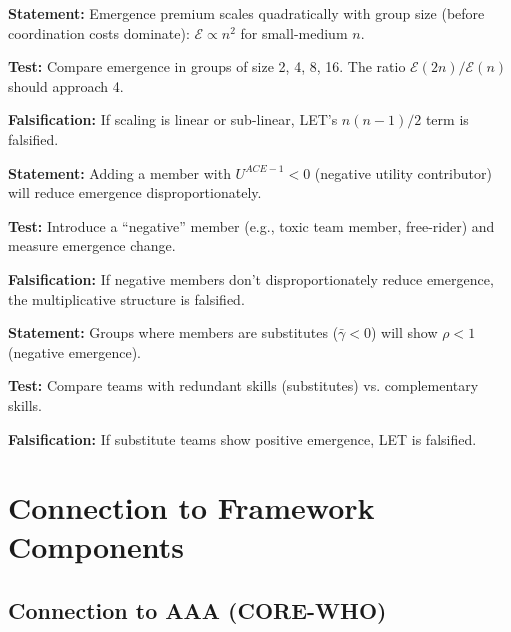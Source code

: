 \begin{tcolorbox}[colback=green!5!white, colframe=green!75!black,
    title=Prediction LET-P2: Quadratic Scaling]
\textbf{Statement:} Emergence premium scales quadratically with group size
(before coordination costs dominate):
$\mathcal{E} \propto n^2$ for small-medium $n$.

\textbf{Test:} Compare emergence in groups of size 2, 4, 8, 16. The
ratio $\mathcal{E}(2n)/\mathcal{E}(n)$ should approach 4.

\textbf{Falsification:} If scaling is linear or sub-linear, LET's
$n(n-1)/2$ term is falsified.
\end{tcolorbox}

\begin{tcolorbox}[colback=green!5!white, colframe=green!75!black,
    title=Prediction LET-P3: Negative Member Effect]
\textbf{Statement:} Adding a member with $U^{ACE-1} < 0$ (negative utility
contributor) will reduce emergence disproportionately.

\textbf{Test:} Introduce a ``negative'' member (e.g., toxic team member,
free-rider) and measure emergence change.

\textbf{Falsification:} If negative members don't disproportionately
reduce emergence, the multiplicative structure is falsified.
\end{tcolorbox}

\begin{tcolorbox}[colback=green!5!white, colframe=green!75!black,
    title=Prediction LET-P4: Substitutes Destroy Emergence]
\textbf{Statement:} Groups where members are substitutes ($\bar{\gamma} < 0$)
will show $\rho < 1$ (negative emergence).

\textbf{Test:} Compare teams with redundant skills (substitutes) vs.
complementary skills.

\textbf{Falsification:} If substitute teams show positive emergence,
LET is falsified.
\end{tcolorbox}


\section{Connection to Framework Components}
\label{sec:let-connections}

\subsection{Connection to AAA (CORE-WHO)}

